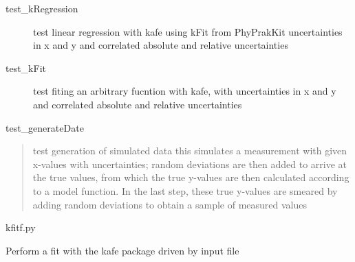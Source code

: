 \documentclass[letterpaper,10pt,english]{sphinxmanual}
\begin{document}
\label{\detokenize{index:module-test_kRegression}}\begin{description}
\item[{test\_kRegression}] \leavevmode
test linear regression with kafe using kFit from PhyPrakKit
uncertainties in x and y and correlated 
absolute and relative uncertainties

\end{description}
\label{\detokenize{index:module-test_kFit}}\begin{description}
\item[{test\_kFit}] \leavevmode
test fiting an arbitrary fucntion with kafe, 
with uncertainties in x and y and correlated 
absolute and relative uncertainties

\end{description}
\label{\detokenize{index:module-test_generateData}}
test\_generateDate
\begin{quote}

test generation of simulated data
this simulates a measurement with given x-values with uncertainties;
random deviations are then added to arrive at the true values, from
which the true y-values are then calculated according to a model
function. In the last step, these true y-values are smeared
by adding random deviations to obtain a sample of measured values
\end{quote}
\label{\detokenize{index:module-kfitf}}
kfitf.py

Perform a fit with the kafe package driven by input file
\end{document}
